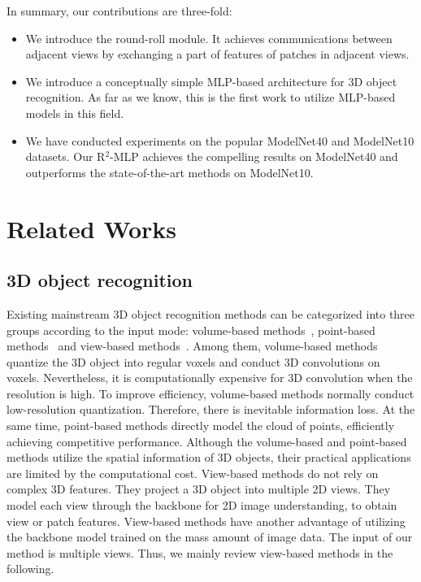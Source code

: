 \documentclass[11pt]{article}
\begin{document}
\newpage

In summary, our contributions are three-fold:
\begin{itemize}
    \item We introduce the round-roll module. It achieves communications between adjacent views by exchanging a part of features of patches in adjacent views.
     \item We introduce a conceptually simple MLP-based architecture for 3D object recognition. As far as we know, this is the first work to utilize MLP-based models in this field.
    \item We have conducted experiments on the popular ModelNet40 and ModelNet10 datasets. Our R$^2$-MLP achieves the compelling results on ModelNet40  and outperforms the state-of-the-art methods on ModelNet10.
\end{itemize}



\section{Related Works}
\subsection{3D object recognition}
Existing mainstream 3D object recognition methods can be categorized into three groups according to the input mode:
volume-based methods~\citep{wu20153d,qi2016volumetric},
point-based methods~\citep{qi2017pointnet,qi2017pointnet++}
and view-based methods~\citep{wang2017dominant,feng2018gvcnn,kanezaki2018rotationnet,han2019seqview2seqlabels,han20193d2seqvies,wei2020view}.
Among them, volume-based methods quantize the 3D object into regular voxels and conduct  3D convolutions on voxels. Nevertheless, it is computationally expensive for 3D convolution when the resolution is high. To improve  efficiency,  volume-based methods  normally conduct low-resolution quantization. Therefore, there is inevitable information loss. At the same time, point-based methods directly model the cloud of points, efficiently achieving competitive performance. Although the volume-based and point-based methods utilize the spatial information of 3D objects, their practical applications are limited by the computational cost. View-based methods do not rely on complex 3D features. They project a 3D object into multiple 2D views. They model each view through the backbone for 2D image understanding, to obtain view  or patch features. View-based methods have another advantage of utilizing the backbone model trained on the mass amount of image data. The input of our method is multiple views. Thus, we mainly review view-based methods in the following.
\end{document}
